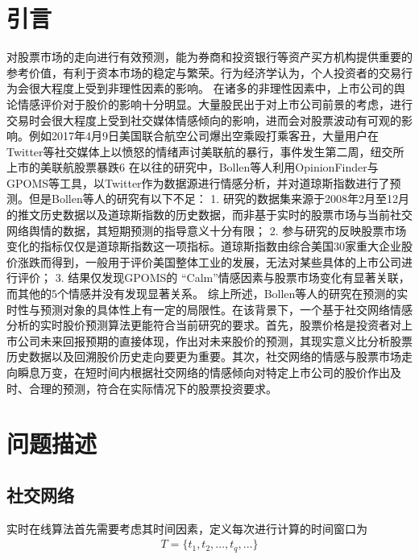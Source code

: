\documentclass[UTF8]{csoarticle}
\begin{document}

\section{引言}

对股票市场的走向进行有效预测，能为券商和投资银行等资产买方机构提供重要的参考价值，有利于资本市场的稳定与繁荣。行为经济学认为，个人投资者的交易行为会很大程度上受到非理性因素的影响。
在诸多的非理性因素中，上市公司的舆论情感评价对于股价的影响十分明显。大量股民出于对上市公司前景的考虑，进行交易时会很大程度上受到社交媒体情感倾向的影响，进而会对股票波动有可观的影响。例如2017年4月9日美国联合航空公司爆出空乘殴打乘客丑，大量用户在Twitter等社交媒体上以愤怒的情绪声讨美联航的暴行，事件发生第二周，纽交所上市的美联航股票暴跌6%
在以往的研究中，Bollen等人利用OpinionFinder与GPOMS等工具，以Twitter作为数据源进行情感分析，并对道琼斯指数进行了预测。但是Bollen等人的研究有以下不足：
1. 研究的数据集来源于2008年2月至12月的推文历史数据以及道琼斯指数的历史数据，而非基于实时的股票市场与当前社交网络舆情的数据，其短期预测的指导意义十分有限；
2. 参与研究的反映股票市场变化的指标仅仅是道琼斯指数这一项指标。道琼斯指数由综合美国30家重大企业股价涨跌而得到，一般用于评价美国整体工业的发展，无法对某些具体的上市公司进行评价；
3. 结果仅发现GPOMS的 “Calm”情感因素与股票市场变化有显著关联，而其他的5个情感并没有发现显著关系。
综上所述，Bollen等人的研究在预测的实时性与预测对象的具体性上有一定的局限性。在该背景下，一个基于社交网络情感分析的实时股价预测算法更能符合当前研究的要求。首先，股票价格是投资者对上市公司未来回报预期的直接体现，作出对未来股价的预测，其现实意义比分析股票历史数据以及回溯股价历史走向要更为重要。其次，社交网络的情感与股票市场走向瞬息万变，在短时间内根据社交网络的情感倾向对特定上市公司的股价作出及时、合理的预测，符合在实际情况下的股票投资要求。


\section{问题描述}

\subsection{社交网络}
实时在线算法首先需要考虑其时间因素，定义每次进行计算的时间窗口为
\begin{align}\label{eq:window}
   T=\{t_1,t_2,...,t_q,...\}
\end{align}
\end{document}
